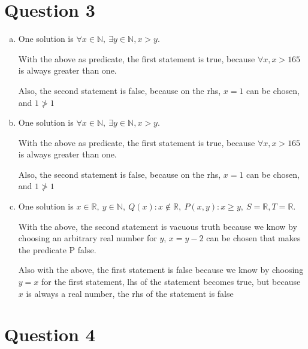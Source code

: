 \documentclass[12pt]{article}
\begin{document}
\section*{Question 3}
\begin{enumerate}[a.]
    \item

    One solution is $\forall x \in \mathbb{N},\:\exists y \in \mathbb{N}, x > y$.

    With the above as predicate, the first statement is true, because $\forall x, x > 165$ is
    always greater than one.

    Also, the second statement is false, because on the rhs, $x = 1$ can be chosen, and $1 \ngtr 1$

    \item

    One solution is $\forall x \in \mathbb{N},\:\exists y \in \mathbb{N}, x > y$.

    With the above as predicate, the first statement is true, because $\forall x, x > 165$ is
    always greater than one.

    Also, the second statement is false, because on the rhs, $x = 1$ can be chosen, and $1 \ngtr 1$

    \item

    One solution is $x \in \mathbb{R},\: y \in \mathbb{N},\:Q(x): x \notin \mathbb{R},\:P(x,y): x \geq y,\:S = \mathbb{R}, T = \mathbb{R}$.

    With the above, the second statement is vacuous truth because we know by choosing an arbitrary real number for $y$,
    $x = y - 2$ can be chosen that makes the predicate P false.

    Also with the above, the first statement is false because we know by choosing $y = x$ for the first statement,
    lhs of the statement becomes true, but because $x$ is always a real number, the rhs of the statement is false



\end{enumerate}

\section*{Question 4}
\end{document}
